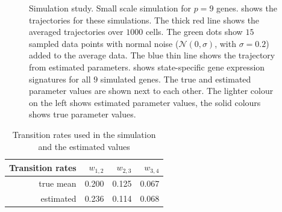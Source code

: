 \begin{figure}
  \centering
  \caption{Simulation study. Small scale simulation for $p=9$ genes.  shows the trajectories for these simulations. The thick red line shows the averaged trajectories over $1000$ cells. The green dots show $15$ sampled data points with normal noise ($\mathcal{N}(0, \sigma)$, with $\sigma=0.2$) added to the average data. The blue thin line shows the trajectory from estimated parameters.  shows state-specific gene expression signatures for all $9$ simulated genes. The true and estimated parameter values are shown next to each other. The lighter colour on the left shows estimated parameter values, the solid colours shows true parameter values.} 
  \label{fig:small-scale-sim}
\end{figure}

\begin{table}[h]
    \centering
\begin{tabular}{r|rrr}
  \hline \hline
  \bf{Transition rates}& $w_{1,2}$ & $w_{2,3}$ & $w_{3,4}$ \\ 
  \hline
  true mean & 0.200 & 0.125 & 0.067 \\ 
  estimated & 0.236 & 0.114 & 0.068 \\ 
   \hline
 \end{tabular}
 \caption{Transition rates used in the simulation and the estimated values}
 \label{tab:fit-w}
\end{table}

